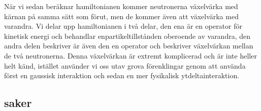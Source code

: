 \documentclass[12pt,a4paper]{article}
\begin{document}
När vi sedan beräknar hamiltonianen kommer neutronerna växelvärka med kärnan på samma sätt som förut, men de kommer även att växelvärka med varandra.
Vi delar upp hamiltonianen i två delar, den ena är en operator för kinetisk energi och behandlar enpartikeltillstånden oberoende av varandra, den andra delen beskriver är även den en operator och beskriver växelvärkan mellan de två neutronerna.
Denna växelvärkan är extremt komplicerad och är inte heller helt känd, istället använder vi oss utav grova förenklingar genom att använda först en gaussisk interaktion och sedan en mer fysikalisk ytdeltainteraktion.


\subsection{saker}
\end{document}
